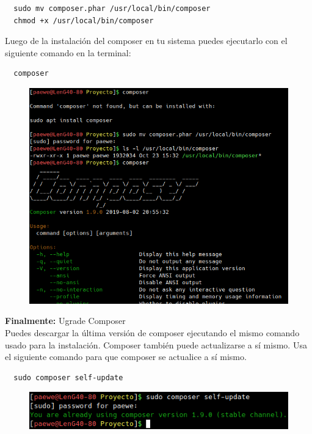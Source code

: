 \documentclass{article}
\begin{document}
\begin{verbatim}
  sudo mv composer.phar /usr/local/bin/composer
  chmod +x /usr/local/bin/composer
\end{verbatim}

Luego de la instalación del composer en tu sistema puedes ejecutarlo con el
siguiente comando en la terminal:\\

\begin{verbatim}
  composer
\end{verbatim}

\begin{figure}[h!]
  \centering
  \includegraphics[scale=0.75]{./Pictures/058_composer.png}
\end{figure}

\textbf{Finalmente:} Ugrade Composer\\
Puedes descargar la última versión de composer ejecutando el mismo comando
usado para la instalación. Composer también puede actualizarse a sí mismo. Usa
el siguiente comando para que composer se actualice a sí mismo.\\

\begin{verbatim}
  sudo composer self-update
\end{verbatim}

\begin{figure}[h!]
  \centering
  \includegraphics[scale=0.75]{./Pictures/059_composerselfupdate.png}
\end{figure}
\end{document}
